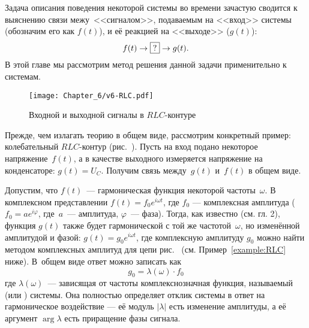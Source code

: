 
Задача описания поведения некоторой системы во времени зачастую сводится 
к выяснению связи межу~<<сигналом>>, подаваемым на <<вход>> системы 
(обозначим его как $f(t)$), и её реакцией на <<выходе>> ($g(t)$):
\begin{equation*}
f(t)\to\fbox{?} \to g(t).
\end{equation*}
В этой главе мы рассмотрим  метод решения данной задачи применительно
к  системам.

\begin{wrapfigure}[10]{o}{0.3\textwidth}
    \centering
    \texttt{[image: Chapter\_6/v6-RLC.pdf]}
    \caption{Входной и выходной сигналы в $RLC$-контуре}
\end{wrapfigure}

Прежде, чем излагать теорию в общем виде, рассмотрим конкретный пример:
колебательный $RLC$-кон\-ту\-р (рис.~).
Пусть на вход подано некоторое напряжение~$f(t)$,
а в качестве выходного измеряется напряжение на конденсаторе: $g(t) = U_C$. 
Получим связь между~$g(t)$ и~$f(t)$ в общем виде.

Допустим, что $f(t)$~--- гармоническая функция некоторой частоты~$\omega$.
В комплексном представлении $f(t) = f_0 e^{i\omega t}$, где 
$f_0$ --- комплексная амплитуда ($f_0=ae^{i\varphi}$, 
где~$a$~--- амплитуда, $\varphi$~--- фаза).
Тогда, как известно (см. гл. 2),
функция $g(t)$ также будет гармонической с той же частотой~$\omega$, 
но изменённой амплитудой и фазой: $g(t) = g_0 e^{i\omega t}$, где
комплексную амплитуду $g_0$ можно найти методом комплексных амплитуд
для цепи рис.~ (см. Пример~\ref{example:RLC} ниже).
В~общем виде ответ можно записать как
\begin{equation*}
g_0 = \lambda(\omega)\cdot f_0
\end{equation*}
где $\lambda(\omega)$~--- зависящая от частоты комплекснозначная функция,
называемый  (или ) системы.
Она полностью определяет отклик системы в ответ на гармоническое воздействие 
--- её модуль $|\lambda|$ есть изменение амплитуды, а её аргумент
$\arg \lambda$ есть приращение фазы сигнала.


